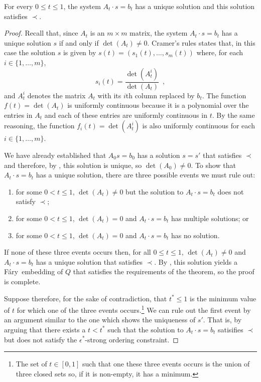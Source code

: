 \documentclass{patmorin}
\newcommand{\Fary}{Fáry}
\begin{document}
\begin{lem}
   For every $0\le t\le 1$, the system $A_t\cdot s=b_t$ has a unique solution
   and this solution satisfies $\prec$.
\end{lem}

\begin{proof}
   Recall that, since $A_t$ is an $m\times m$ matrix, the system $A_t\cdot
   s=b_t$ has a unique solution $s$ if and only if $\det(A_t)\neq 0$.
   Cramer's rules states that, in this case the solution $s$ is given
   by $s(t)=(s_1(t),\ldots,s_m(t))$ where, for each $i\in\{1,\ldots,m\}$,
   \[ 
       s_i(t) = \frac{\det(A_t^i)}{\det(A_t)} \enspace ,
   \]
   and $A_t^i$ denotes the matrix $A_t$ with its $i$th column replaced
   by $b_t$. The function $f(t)=\det(A_t)$ is uniformly continuous
   because it is a polynomial over the entries in $A_t$ and each of
   these entries are uniformly continuous in $t$. By the same reasoning,
   the function $f_i(t)=\det(A_t^i)$ is also uniformly continuous for
   each $i\in\{1,\ldots,m\}$.

   We have already established that $A_0s=b_0$ has a solution $s=s'$
   that satisfies $\prec$ and therefore, by , this
   solution is unique, so $\det(A_0)\neq 0$.  To show that $A_t\cdot s=b_t$
   has a unique solution, there are three possible events we must rule out:
   \begin{enumerate}
     \item for some $0<t\le 1$, $\det(A_t)\neq 0$ but
           the solution to $A_t\cdot s=b_t$ does not satisfy $\prec$;
     \item for some $0<t\le 1$, $\det(A_t)=0$ and $A_t\cdot s=b_t$ has multiple 
           solutions; or
     \item for some $0<t\le 1$, $\det(A_t)=0$ and $A_t\cdot s=b_t$ has no solution.
   \end{enumerate}
   If none of these three events occurs then, for all $0\le t\le 1$,
   $\det(A_t)\neq 0$ and $A_t\cdot s=b_t$ has a unique solution that
   satisfies $\prec$. By , this solution
   yields a \Fary\ embedding of $Q$ that satisfies the requirements of
   the theorem, so the proof is complete.

   Suppose therefore, for the sake of contradiction, that $t^*\le
   1$ is the minimum value of $t$ for which one of the three events
   occurs.\footnote{The set of $t\in[0,1]$ such that one these three
   events occurs is the union of three closed sets so, if it is non-empty,
   it has a minimum.} We can rule out the first event by an argument
   similar to the one which shows the uniqueness of $s'$.  That is,
   by arguing that there exists a $t<t^*$ such that the solution to
   $A_{t}\cdot s=b_{t}$ satisifies $\prec$ but does not satisfy the
   $\epsilon^*$-strong ordering constraint.


\end{proof}
\end{document}
